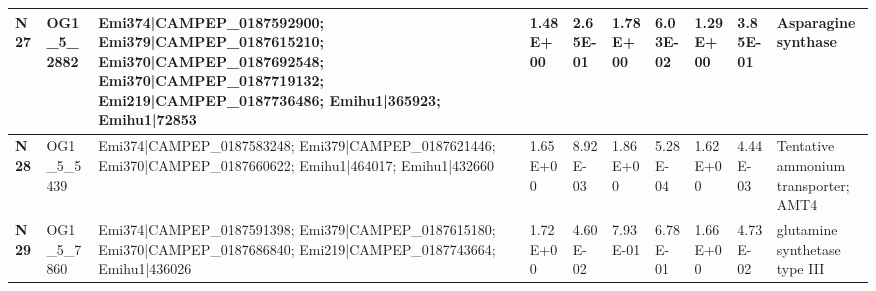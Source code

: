 \begin{landscape}
\begin{center}
\begin{footnotesize}
\begin{longtable}{|p{0.5cm}|p{1.5cm}|p{4cm}|l|l|l|l|l|l|l|}
\textbf{N27} & OG1\_5\_2882  & Emi374|CAMPEP\_0187592900; Emi379|CAMPEP\_0187615210; Emi370|CAMPEP\_0187692548; Emi370|CAMPEP\_0187719132; Emi219|CAMPEP\_0187736486; Emihu1|365923; Emihu1|72853                                                                                                                                                                                                                                                                                                                                                                                                                                                                       & 1.48E+00  & 2.65E-01 & 1.78E+00  & 6.03E-02 & 1.29E+00  & 3.85E-01 & Asparagine synthase                                                          \\ \hline
\textbf{N28} & OG1\_5\_5439  & Emi374|CAMPEP\_0187583248; Emi379|CAMPEP\_0187621446; Emi370|CAMPEP\_0187660622; Emihu1|464017; Emihu1|432660                                                                                                                                                                                                                                                                                                                                                                                                                                                                                                                            & 1.65E+00  & 8.92E-03 & 1.86E+00  & 5.28E-04 & 1.62E+00  & 4.44E-03 & Tentative ammonium transporter; AMT4                                         \\ \hline
\textbf{N29} & OG1\_5\_7860  & Emi374|CAMPEP\_0187591398; Emi379|CAMPEP\_0187615180; Emi370|CAMPEP\_0187686840; Emi219|CAMPEP\_0187743664; Emihu1|436026                                                                                                                                                                                                                                                                                                                                                                                                                                                                                                                & 1.72E+00  & 4.60E-02 & 7.93E-01  & 6.78E-01 & 1.66E+00  & 4.73E-02 & glutamine synthetase type III                                                \\ \hline

\end{longtable}
\end{footnotesize}
\end{center}
\end{landscape}
